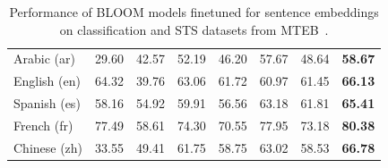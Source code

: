 \begin{table}[th!]
{\begin{tabular}{lccccccc}
\midrule
Arabic (ar) & 29.60 & 42.57 & 52.19 & 46.20 & 57.67 & 48.64 & \textbf{58.67} \\
English (en) & 64.32 & 39.76 & 63.06 & 61.72 & 60.97 & 61.45 & \textbf{66.13} \\
Spanish (es) & 58.16 & 54.92 & 59.91 & 56.56 & 63.18 & 61.81 & \textbf{65.41} \\
French (fr) & 77.49 & 58.61 & 74.30 & 70.55 & 77.95 & 73.18 & \textbf{80.38} \\
Chinese (zh) & 33.55 & 49.41 & 61.75 & 58.75 & 63.02 & 58.53 & \textbf{66.78} \\
\bottomrule
\end{tabular}}
\caption{Performance of BLOOM models finetuned for sentence embeddings on classification and STS datasets from MTEB~\citep{muennighoff2022crosslingual}.}
\label{tab:bloom:emb}
\end{table}